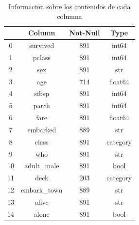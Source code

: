 \begin{table}[h]
\centering
\caption{Informacion sobre los contenidos de cada columna}
\label{tab:df_tabla_metodo_info}
\begin{tabular}{cccc}
\toprule
 & Column & Not-Null & Type \\
\midrule
0 & survived & 891 & int64 \\
1 & pclass & 891 & int64 \\
2 & sex & 891 & str \\
3 & age & 714 & float64 \\
4 & sibsp & 891 & int64 \\
5 & parch & 891 & int64 \\
6 & fare & 891 & float64 \\
7 & embarked & 889 & str \\
8 & class & 891 & category \\
9 & who & 891 & str \\
10 & adult\_male & 891 & bool \\
11 & deck & 203 & category \\
12 & embark\_town & 889 & str \\
13 & alive & 891 & str \\
14 & alone & 891 & bool \\
\bottomrule
\end{tabular}
\end{table}
